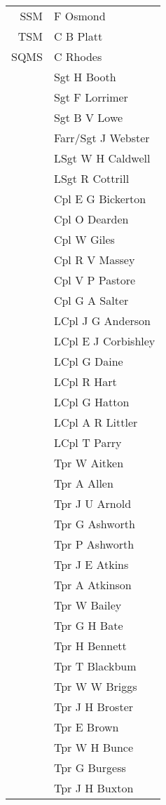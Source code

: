 \begin{center}
  \begin{tabular}{rl}
    SSM & F Osmond \\
    TSM & C B Platt \\
    SQMS & C Rhodes \\
    & Sgt H Booth \\
    & Sgt F Lorrimer \\
    & Sgt B V Lowe \\
    & Farr/Sgt J Webster \\
    & LSgt W H Caldwell \\
    & LSgt R Cottrill \\
    & Cpl E G Bickerton \\
    & Cpl O Dearden \\
    & Cpl W Giles \\
    & Cpl R V Massey \\
    & Cpl V P Pastore \\
    & Cpl G A Salter \\
    & LCpl J G Anderson \\
    & LCpl E J Corbishley \\
    & LCpl G Daine \\
    & LCpl R Hart \\
    & LCpl G Hatton \\
    & LCpl A R Littler \\
    & LCpl T Parry \\
    & Tpr W Aitken \\
    & Tpr A Allen \\
    & Tpr J U Arnold \\
    & Tpr G Ashworth \\
    & Tpr P Ashworth \\
    & Tpr J E Atkins \\
    & Tpr A Atkinson \\
    & Tpr W Bailey \\
    & Tpr G H Bate \\
    & Tpr H Bennett \\
    & Tpr T Blackbum \\
    & Tpr W W Briggs \\
    & Tpr J H Broster \\
    & Tpr E Brown \\
    & Tpr W H Bunce \\
    & Tpr G Burgess \\
    & Tpr J H Buxton \\

\end{tabular}
\end{center}

